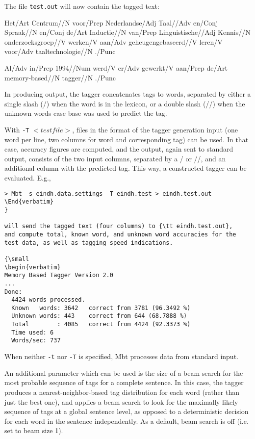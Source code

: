 \documentclass{report}
\begin{document}
The file {\tt test.out} will now contain the tagged text:

{\small 

Het/Art Centrum//N voor/Prep Nederlandse/Adj Taal//Adv en/Conj
Spraak//N en/Conj de/Art Inductie//N van/Prep Linguistische//Adj
Kennis//N onderzoeksgroep//V werken/V aan/Adv geheugengebaseerd//V
leren/V voor/Adv taaltechnologie//N ./Punc

Al/Adv in/Prep 1994//Num werd/V er/Adv gewerkt/V aan/Prep de/Art memory-based//N tagger//N ./Punc  
}

In producing output, the tagger concatenates tags to words,
separated by either a single slash (/) when the word is in the
lexicon, or a double slash (//) when the unknown words case base was
used to predict the tag.

With {\tt -T} $<testfile>$, files in the format of the tagger generation
input (one word per line, two columns for word and corresponding tag)
can be used. In that case, accuracy figures are computed, and the
output, again sent to standard output, consists of the two input
columns, separated by a / or //, and an additional column with the
predicted tag. This way, a constructed tagger can be evaluated. E.g., 

{\small
\begin{verbatim}
> Mbt -s eindh.data.settings -T eindh.test > eindh.test.out
\End{verbatim}
}

will send the tagged text (four columns) to {\tt eindh.test.out},
and compute total, known word, and unknown word accuracies for the
test data, as well as tagging speed indications.

{\small
\begin{verbatim}
Memory Based Tagger Version 2.0
...
Done:
  4424 words processed.
  Known   words: 3642   correct from 3781 (96.3492 %)
  Unknown words: 443    correct from 644 (68.7888 %)
  Total        : 4085   correct from 4424 (92.3373 %)
  Time used: 6
  Words/sec: 737
\end{verbatim}
}

When neither {\tt -t} nor {\tt -T} is specified, Mbt processes data from
standard input.

An additional parameter which can be used is the size of a beam search
for the most probable sequence of tags for a complete sentence. In
this case, the tagger produces a nearest-neighbor-based tag
distribution for each word (rather than just the best one), and
applies a beam search to look for the maximally likely sequence of tags
at a global sentence level, as opposed to a deterministic decision for
each word in the sentence independently. As a default, beam search is
off (i.e. set to beam size 1).
\end{document}
